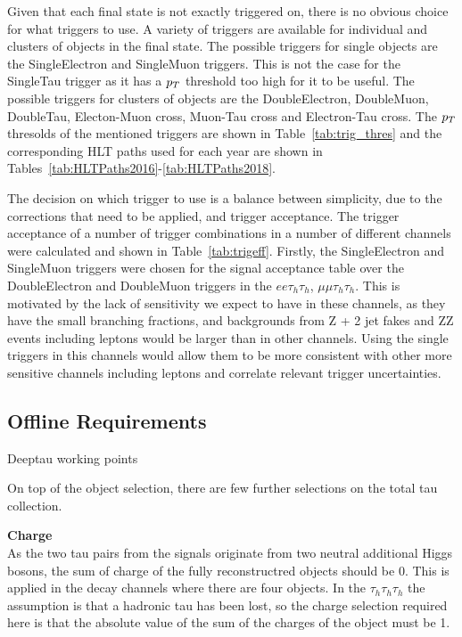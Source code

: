 Given that each final state is not exactly triggered on, there is no obvious choice for what triggers to use. 
A variety of triggers are available for individual and clusters of objects in the final state. 
The possible triggers for single objects are the SingleElectron and SingleMuon triggers. 
This is not the case for the SingleTau trigger as it has a $p_{T}$ threshold too high for it to be useful. 
The possible triggers for clusters of objects are the DoubleElectron, DoubleMuon, DoubleTau, Electon-Muon cross, Muon-Tau cross and Electron-Tau cross. 
The $p_{T}$ thresolds of the mentioned triggers are shown in Table~\ref{tab:trig_thres} and the corresponding HLT paths used for each year are shown in Tables~\ref{tab:HLTPaths2016}-\ref{tab:HLTPaths2018}.

The decision on which trigger to use is a balance between simplicity, due to the corrections that need to be applied, and trigger acceptance. 
The trigger acceptance of a number of trigger combinations in a number of different channels were calculated and shown in Table~\ref{tab:trigeff}. 
Firstly, the SingleElectron and SingleMuon triggers were chosen for the signal acceptance table over the DoubleElectron and DoubleMuon triggers in the $ee\tau_h \tau_h$, $\mu\mu\tau_h \tau_h$. 
This is motivated by the lack of sensitivity we expect to have in these channels, as they have the small branching fractions, and backgrounds from Z + 2 jet fakes and ZZ events including leptons would be larger than in other channels. 
Using the single triggers in this channels would allow them to be more consistent with other more sensitive channels including leptons and correlate relevant trigger uncertainties.



\subsection{Offline Requirements}

Deeptau working points

On top of the object selection, there are few further selections on the total tau collection.

\textbf{Charge}~\\
As the two tau pairs from the signals originate from two neutral additional Higgs bosons, the sum of charge of the fully reconstructred objects should be 0. This is applied in the decay channels where there are four objects. In the $\tau_h \tau_h \tau_h$ the assumption is that a hadronic tau has been lost, so the charge selection required here is that the absolute value of the sum of the charges of the object must be 1.

